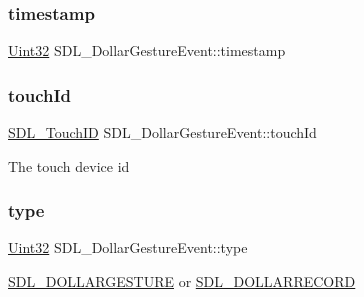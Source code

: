 \subsubsection{\texorpdfstring{timestamp}{timestamp}}
{\footnotesize\ttfamily \hyperlink{_s_d_l__stdinc_8h_add440eff171ea5f55cb00c4a9ab8672d}{Uint32} S\+D\+L\+\_\+\+Dollar\+Gesture\+Event\+::timestamp}

\mbox{\label{struct_s_d_l___dollar_gesture_event_a40402f6911ed0dba48e6b23aa02bd83d}} 
\subsubsection{\texorpdfstring{touch\+Id}{touchId}}
{\footnotesize\ttfamily \hyperlink{_s_d_l__touch_8h_a10f5f86abe4ea8308a8706bd5d3b337a}{S\+D\+L\+\_\+\+Touch\+ID} S\+D\+L\+\_\+\+Dollar\+Gesture\+Event\+::touch\+Id}

The touch device id \mbox{\label{struct_s_d_l___dollar_gesture_event_ac7f6948754a1b2eb36edde043bf75ce9}} 
\subsubsection{\texorpdfstring{type}{type}}
{\footnotesize\ttfamily \hyperlink{_s_d_l__stdinc_8h_add440eff171ea5f55cb00c4a9ab8672d}{Uint32} S\+D\+L\+\_\+\+Dollar\+Gesture\+Event\+::type}

\hyperlink{_s_d_l__events_8h_a3b589e89be6b35c02e0dd34a55f3fccaaac5b40f77c7e1eba688d536d465989c6}{S\+D\+L\+\_\+\+D\+O\+L\+L\+A\+R\+G\+E\+S\+T\+U\+RE} or \hyperlink{_s_d_l__events_8h_a3b589e89be6b35c02e0dd34a55f3fccaa9ce9b2a0e8fd0e130d8ac8499704a277}{S\+D\+L\+\_\+\+D\+O\+L\+L\+A\+R\+R\+E\+C\+O\+RD} \mbox{\label{struct_s_d_l___dollar_gesture_event_a9888449bd8842ed96494b4db16a6097b}} 
